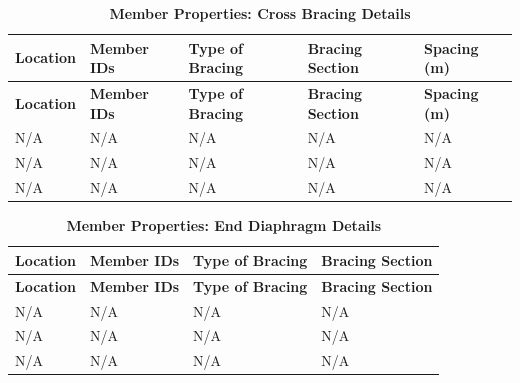 \documentclass[12pt,a4paper]{report}
\numberwithin{table}{chapter}
\numberwithin{figure}{chapter}
\newcommand{\ReportTableSetup}{%
  \setlength{\tabcolsep}{3.0pt}%
  \renewcommand{\arraystretch}{1.18}%
  \setlength{\arrayrulewidth}{0.4pt}\setlength{\extrarowheight}{0.5pt}%
  \setlength{\LTleft}{\fill}\setlength{\LTright}{\fill}%
  \setlength{\LTpre}{4pt}\setlength{\LTpost}{8pt}}
\newcommand{\ReportTableFont}{\small}
\newcommand{\ReportRowGap}{3.0pt}
\newcommand{\ReportTableGap}{\vspace{0.5em}}
\begin{document}
\ReportTableGap


\begingroup
\ReportTableSetup
\ReportTableFont
\begin{longtable}{|L{2.4000cm}|L{2.4000cm}|L{3.6000cm}|L{3.6000cm}|C{2.5000cm}|}
\caption{\textbf{Member Properties: Cross Bracing Details}}\\
\hline
\textbf{Location} & \textbf{Member IDs} & \textbf{Type of Bracing} & \textbf{Bracing Section} & \textbf{Spacing (m)} \\
\hline
\endfirsthead
\hline
\textbf{Location} & \textbf{Member IDs} & \textbf{Type of Bracing} & \textbf{Bracing Section} & \textbf{Spacing (m)} \\
\hline
\endhead
\hline
\endfoot
\hline
\endlastfoot

N/A & N/A & N/A & N/A & N/A \\[\ReportRowGap]
\hline
N/A & N/A & N/A & N/A & N/A \\[\ReportRowGap]
\hline
N/A & N/A & N/A & N/A & N/A \\[\ReportRowGap]
\hline
\end{longtable}
\endgroup

\ReportTableGap
\noindent


\begingroup
\ReportTableSetup
\ReportTableFont
\begin{longtable}{|L{2.8000cm}|L{2.8000cm}|L{4.4000cm}|L{4.5000cm}|}
\caption{\textbf{Member Properties: End Diaphragm Details}}\\
\hline
\textbf{Location} & \textbf{Member IDs} & \textbf{Type of Bracing} & \textbf{Bracing Section} \\
\hline
\endfirsthead
\hline
\textbf{Location} & \textbf{Member IDs} & \textbf{Type of Bracing} & \textbf{Bracing Section} \\
\hline
\endhead
\hline
\endfoot
\hline
\endlastfoot

N/A & N/A & N/A & N/A \\[\ReportRowGap]
\hline
N/A & N/A & N/A & N/A \\[\ReportRowGap]
\hline
N/A & N/A & N/A & N/A \\[\ReportRowGap]
\hline
\end{longtable}
\endgroup



\label{subsec:shear-connectors}

\ReportTableGap
\end{document}
